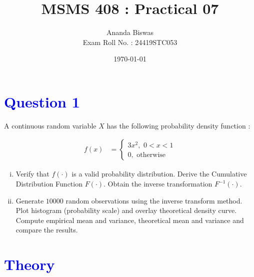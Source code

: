 \documentclass[11pt, a4paper]{article}\usepackage[]{graphicx}\usepackage[]{xcolor}
\title{MSMS 408 : Practical 07}
\author{Ananda Biswas \\[1em] Exam Roll No. : 24419STC053}
\date{\today}
\begin{document}
\maketitle


\section*{\faArrowAltCircleRight[regular] \textcolor{blue}{Question 1}}

\hspace{1cm} A continuous random variable $X$ has the following probability density function :

\begin{align*}
f(x) &= \begin{cases}
            3x^2, \,\, 0 < x < 1 \\[0.2em]
            0, \,\, \text{otherwise}
        \end{cases}
\end{align*}
\begin{enumerate}[(i)]
\item Verify that $f(\cdot)$ is a valid probability distribution. Derive the Cumulative Distribution Function $F(\cdot)$. Obtain the inverse transformation $F^{-1}(\cdot)$.

\item Generate $10000$ random observations using the inverse transform method. Plot histogram (probability scale) and overlay theoretical density curve. Compute empirical mean and variance, theoretical mean and variance and compare the results.
\end{enumerate}

\section*{\faArrowAltCircleRight[regular] \textcolor{blue}{Theory}}
\end{document}
